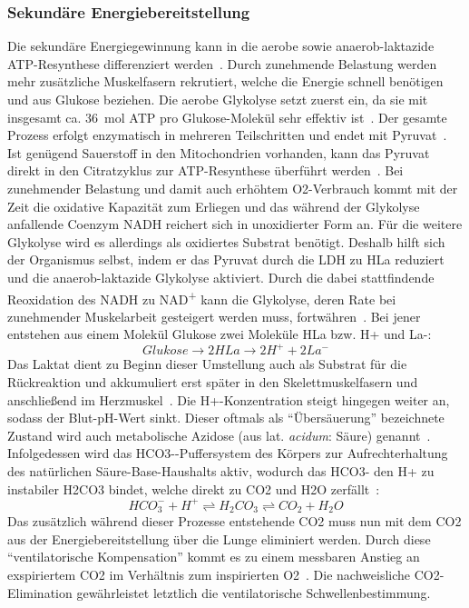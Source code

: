 \subsubsection{Sekundäre Energiebereitstellung}
%
Die sekundäre Energiegewinnung kann in die aerobe sowie anaerob-laktazide ATP-Resynthese differenziert werden~\cite{Kroidl.2015}. Durch zunehmende Belastung werden mehr zusätzliche Muskelfasern rekrutiert, welche die Energie schnell benötigen und aus Glukose beziehen. Die aerobe Glykolyse setzt zuerst ein, da sie mit insgesamt ca. \SI{36}{\mole} ATP pro Glukose-Molekül sehr effektiv ist~\cite{Kroidl.2015}. Der gesamte Prozess erfolgt enzymatisch in mehreren Teilschritten und endet mit Pyruvat~\cite{Heck.2006}. Ist genügend Sauerstoff in den Mitochondrien vorhanden, kann das Pyruvat direkt in den Citratzyklus zur ATP-Resynthese überführt werden~\cite{Rassow.2008}. Bei zunehmender Belastung und damit auch erhöhtem \gls{O2}-Verbrauch kommt mit der Zeit die oxidative Kapazität zum Erliegen und das während der Glykolyse anfallende Coenzym \gls{NADH} reichert sich in unoxidierter Form an. Für die weitere Glykolyse wird es allerdings als oxidiertes Substrat benötigt. Deshalb hilft sich der Organismus selbst, indem er das Pyruvat durch die \gls{LDH} zu \gls{HLa} reduziert~\cite{Rassow.2008} und die anaerob-laktazide Glykolyse aktiviert. Durch die dabei stattfindende Reoxidation des \gls{NADH} zu NAD\textsuperscript{+} kann die Glykolyse, deren Rate bei zunehmender Muskelarbeit gesteigert werden muss, fortwähren~\cite{Heck.2006}. Bei jener entstehen aus einem Molekül Glukose zwei Moleküle \gls{HLa} bzw. \gls{H+} und \gls{La-}:
%
\begin{equation}
Glukose \rightarrow 2 HLa \rightarrow 2 H^+ + 2 La^-
\label{eq:formel4}
\end{equation}
%
Das Laktat dient zu Beginn dieser Umstellung auch als Substrat für die Rückreaktion und akkumuliert erst später in den Skelettmuskelfasern und anschließend im Herzmuskel~\cite{Klinke.2003}. Die \gls{H+}-Konzentration steigt hingegen weiter an, sodass der Blut-pH-Wert sinkt. Dieser oftmals als "`Übersäuerung"' bezeichnete Zustand wird auch metabolische Azidose (aus lat. \textsl{acidum}: Säure) genannt~\cite{Boening.2008}. Infolgedessen wird das \gls{HCO3-}-Puffersystem des Körpers zur Aufrechterhaltung des natürlichen Säure-Base-Haushalts aktiv, wodurch das \gls{HCO3-} den \gls{H+} zu instabiler \gls{H2CO3} bindet, welche direkt zu \gls{CO2} und \gls{H2O} zerfällt~\cite{Kroidl.2015}:
%
\begin{equation}
HCO_3^- + H^+ \rightleftharpoons H_2CO_3 \rightleftharpoons CO_2 + H_2O
\label{eq:formel5}
\end{equation}
%
Das zusätzlich während dieser Prozesse entstehende \gls{CO2} muss nun mit dem \gls{CO2} aus der Energiebereitstellung über die Lunge eliminiert werden. Durch diese "`ventilatorische Kompensation"' kommt es zu einem messbaren Anstieg an exspiriertem \gls{CO2} im Verhältnis zum inspirierten \gls{O2}~\cite{Boening.2008}. Die nachweisliche \gls{CO2}-Elimination gewährleistet letztlich die ventilatorische Schwellenbestimmung.
%
